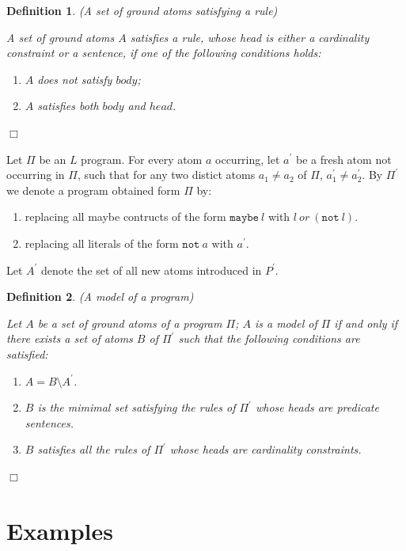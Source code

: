 \documentclass[a4paper,10pt]{article}
\newtheorem{definition}{Definition}
\begin{document}
\begin{definition}(A set of ground atoms satisfying a rule)\\
\rm{
A set of ground atoms $A$ satisfies a rule, whose head is either a cardinality constraint or a sentence, if one of the following conditions holds:
\begin{enumerate}
\item $A$ does not satisfy $body$;
\item $A$ satisfies both $body$ and $head$.
\end{enumerate}
}
\hfill $\Box$
\end{definition}




Let $\Pi$ be an $L$ program.
For every atom $a$ occurring, let $a^\prime$ be a fresh atom not occurring in $\Pi$, such that for any two distict atoms $a_1 \not= a_2$ of $\Pi$, $a^\prime_1 \not= a^\prime_2$.
By $\Pi^\prime$ we denote a program obtained form $\Pi$ by:

\begin{enumerate}
\item replacing all maybe contructs of the form $\texttt{maybe}~l$ with $l~or~(\texttt{not}~l)$.
\item replacing all literals of the form $\texttt{not}~a$ with $a^\prime$. 
\end{enumerate}

\noindent
Let $A^\prime$ denote the set of all new atoms introduced in $P^\prime$.


\begin{definition}(A model of a program)\\
\rm{
Let $A$ be a set of ground atoms of a program $\Pi$; $A$ is a model of $\Pi$ if and only if 
there exists a set of atoms $B$ of $\Pi^\prime$ such that  the following conditions are satisfied:
\begin{enumerate}
\item $A = B \setminus A^\prime$.
\item $B$ is the mimimal set satisfying the rules of $\Pi^\prime$ whose heads are predicate sentences.
\item $B$ satisfies all the rules of $\Pi^\prime$ whose heads are cardinality constraints.
\end{enumerate}
}
\hfill$\Box$
\end{definition}

\section{Examples}
\end{document}
